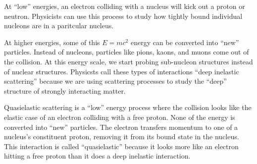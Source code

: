 At “low” energies, an electron colliding with a nucleus will kick out a proton
or neutron.
Physicists can use this process to study how tightly bound individual nucleons
are in a paritcular nucleus.

At higher energies, some of this $E=mc^2$ energy can be converted into “new”
particles.
Instead of nucleons, particles like pions, kaons, and muons come out of the
collision.
At this energy scale, we start probing sub-nucleon structures instead of
nuclear structures.
Physicsts call these types of interactions “deep inelastic scattering” because
we are using scattering processes to study the “deep” structure of strongly
interacting matter.

Quasielastic scattering is a “low” energy process where the collision looks
like the elastic case of an electron colliding with a free proton.
None of the energy is converted into “new” particles.
The electron transfers momentum to one of a nucleus’s constituent proton,
removing it from its bound state in the nucleus.
This interaction is called “quasielastic” because it looks more like an
electron hitting a free proton than it does a deep inelastic interaction.


